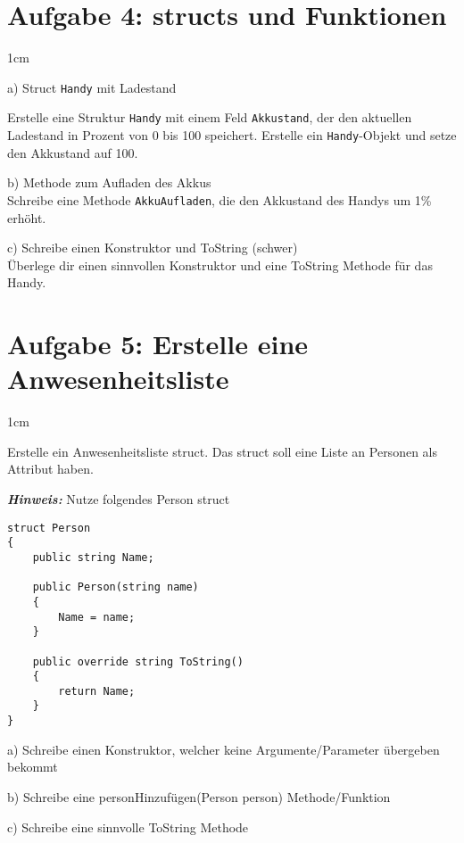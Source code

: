 \documentclass[12pt]{article}
\newenvironment{aufgabe}[2]
  {%
   \section*{Aufgabe #1: #2}
   \vspace{0.5em}
   \begin{adjustwidth}{1cm}{}  %
  }
  {%
   \end{adjustwidth}
  }
\newcommand{\subaufgabe}[1]{
    #1
}
\newcommand{\hint}[1]{
    \vspace{0.5em}
    \textbf{\textit{Hinweis:}} #1
    \vspace{0.5em}
}
\begin{document}
\begin{aufgabe}{4}{structs und Funktionen}

\subaufgabe{a) Struct \texttt{Handy} mit Ladestand}
Erstelle eine Struktur \texttt{Handy} mit einem Feld \texttt{Akkustand}, der den aktuellen Ladestand in Prozent von 0 bis 100 speichert. Erstelle ein \texttt{Handy}-Objekt und setze den Akkustand auf 100.

\subaufgabe{b) Methode zum Aufladen des Akkus \\
Schreibe eine Methode \texttt{AkkuAufladen}, die den Akkustand des Handys um 1\% erhöht.
}

\subaufgabe{c) Schreibe einen Konstruktor und ToString (schwer)\\
Überlege dir einen sinnvollen Konstruktor und eine ToString Methode für das Handy.
}

\end{aufgabe}

\newpage

\begin{aufgabe}{5}{Erstelle eine Anwesenheitsliste}

Erstelle ein Anwesenheitsliste struct. Das struct soll eine Liste an Personen als Attribut haben.

\hint{ Nutze folgendes Person struct}
\begin{lstlisting}
struct Person
{
    public string Name;
    
    public Person(string name)
    {
        Name = name;
    }

    public override string ToString()
    {
        return Name;
    }
}
\end{lstlisting}

\subaufgabe{a) Schreibe einen Konstruktor, welcher keine Argumente/Parameter übergeben bekommt}

\subaufgabe{b) Schreibe eine personHinzufügen(Person person) Methode/Funktion}

\subaufgabe{c) Schreibe eine sinnvolle ToString Methode}

\end{aufgabe}
\end{document}
